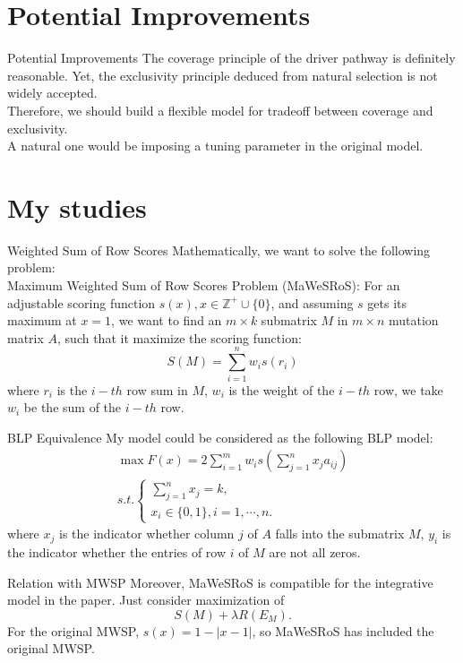 \documentclass[xcolor=dvipsnames]{beamer}
\begin{document}
\section{Potential Improvements}
\begin{frame}{Potential Improvements}
The coverage principle of the driver pathway is definitely reasonable. Yet, the exclusivity principle deduced from natural selection is not widely accepted.\\
Therefore, we should build a flexible model for tradeoff between coverage and exclusivity.\\
A natural one would be imposing a tuning parameter in the original model.\\
\end{frame}
\section{My studies}
\begin{frame}{Weighted Sum of Row Scores}
Mathematically, we want to solve the following problem:\\
Maximum Weighted Sum of Row Scores Problem (MaWeSRoS): For an adjustable scoring function $s(x),x\in \mathbb{Z}^+\cup \{0\}$, and assuming $s$ gets its maximum at $x=1$,  we want to find an $m\times k$ submatrix $M$ in $m\times n$ mutation matrix $A$, such that it maximize the scoring function:
\[
S(M)=\sum_{i=1}^nw_is(r_i)
\]
where $r_i$ is the $i-th$ row sum in $M$, $w_i$ is the weight of the $i-th$ row, we take $w_i$ be the sum of the $i-th$ row.\\
\end{frame}
\begin{frame}{BLP Equivalence}
My model could be considered as the following BLP model:
\begin{eqnarray}
\max F(x)=2\sum_{i=1}^mw_is(\sum_{j=1}^nx_ja_{ij})\nonumber\\
s.t.
\left\{
\begin{array}{c}
\sum_{j=1}^nx_j=k,\\
x_i\in\{0,1\},i=1,\cdots,n.
\end{array}
\right.\nonumber
\end{eqnarray}
where $x_j$ is the indicator whether column $j$ of $A$ falls into the submatrix $M$, $y_i$ is the indicator whether the entries of row $i$ of $M$ are not all zeros.\\
\end{frame}
\begin{frame}{Relation with MWSP}
Moreover, MaWeSRoS is compatible for the integrative model in the paper. Just consider maximization of
\[
S(M)+\lambda R(E_M).
\]
For the original MWSP, $s(x)=1-|x-1|$, so MaWeSRoS has included the original MWSP.\\
\end{frame}
\end{document}

